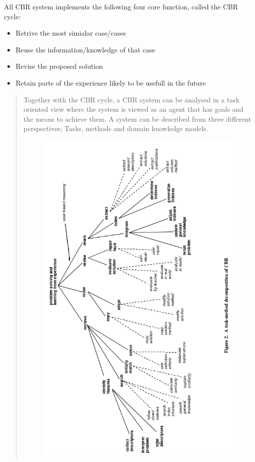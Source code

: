 \documentclass[11pt, letterpaper]{report}
\numberwithin{equation}{section}
\begin{document}
All CBR system implements the following four core function, called the CBR
cycle:
\begin{itemize}
\item Retrive the most simialar case/cases
\item Reuse the information/knowledge of that case
\item Revise the proposed solution
\item Retain parts of the experience likely to be usefull in the future
\end{itemize}

\begin{quote}
Together with the CBR cycle, a CBR system can be analysed in a task oriented
view where the system is viewed as an agent that has goals and the means to
achieve them. A system can be described from three different perspectives;
Tasks, methods and domain knowledge models.
\begin{figure}
  \centering
  \includegraphics[scale=0.75, angle=270]{task_meth_decomp}
\end{figure}
\end{quote}
\end{document}
